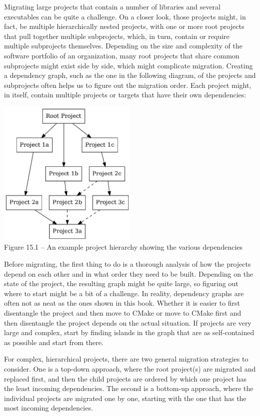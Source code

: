 
Migrating large projects that contain a number of libraries and several executables can be quite a challenge. On a closer look, those projects might, in fact, be multiple hierarchically nested projects, with one or more root projects that pull together multiple subprojects, which, in turn, contain or require multiple subprojects themselves. Depending on the size and complexity of the software portfolio of an organization, many root projects that share common subprojects might exist side by side, which might complicate migration. Creating a dependency graph, such as the one in the following diagram, of the projects and subprojects often helps us to figure out the migration order. Each project might, in itself, contain multiple projects or targets that have their own dependencies:

\begin{center}
\includegraphics[width=0.5\textwidth]{content/3/chapter15/images/1.jpg}\\
Figure 15.1 – An example project hierarchy showing the various dependencies
\end{center}

Before migrating, the first thing to do is a thorough analysis of how the projects depend on each other and in what order they need to be built. Depending on the state of the project, the resulting graph might be quite large, so figuring out where to start might be a bit of a challenge. In reality, dependency graphs are often not as neat as the ones shown in this book. Whether it is easier to first disentangle the project and then move to CMake or move to CMake first and then disentangle the project depends on the actual situation. If projects are very large and complex, start by finding islands in the graph that are as self-contained as possible and start from there.

For complex, hierarchical projects, there are two general migration strategies to consider. One is a top-down approach, where the root project(s) are migrated and replaced first, and then the child projects are ordered by which one project has the least incoming dependencies. The second is a bottom-up approach, where the individual projects are migrated one by one, starting with the one that has the most incoming dependencies.

